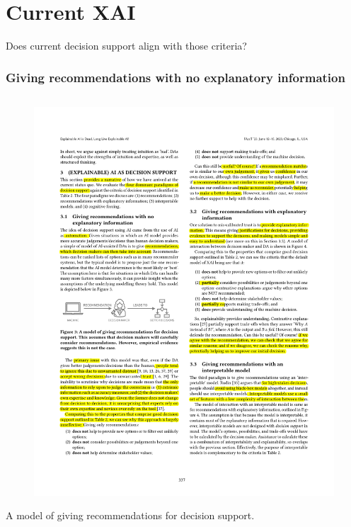 \documentclass[compress,12pt]{beamer}
\begin{document}
\section{Current XAI}

\begin{frame}[standout]
      \centering\large
      Does current decision support align with those criteria?
\end{frame}

\begin{frame}
      \frametitle{Giving recommendations with no explanatory information}
      \begin{columns}[T] %
            \begin{column}{.75\textwidth}
                  \begin{figure}[htbp]
                        \centering
                        \includegraphics[width=.9\textwidth]{fig3.pdf}
                  \end{figure}
                  A model of giving recommendations for decision support. 
                  

\end{column}
\end{columns}
\end{frame}
\end{document}
